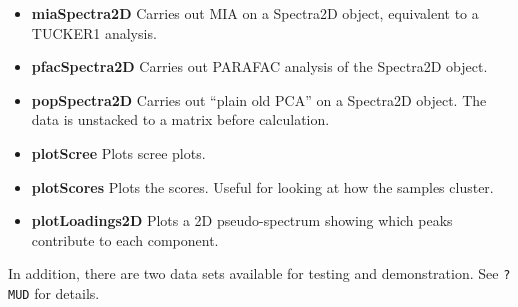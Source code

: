\documentclass[letter,10pt,twocolumn,twoside,printwatermark=false]{pinp}
\providecommand{\tightlist}{%
  \setlength{\itemsep}{0pt}\setlength{\parskip}{0pt}}
\begin{document}
\begin{itemize}
  \begin{itemize}
  \tightlist
  \item
    \textbf{miaSpectra2D} Carries out MIA on a Spectra2D object,
    equivalent to a TUCKER1 analysis.
  \item
    \textbf{pfacSpectra2D} Carries out PARAFAC analysis of the Spectra2D
    object.
  \item
    \textbf{popSpectra2D} Carries out ``plain old PCA'' on a Spectra2D
    object. The data is unstacked to a matrix before calculation.
  \item
    \textbf{plotScree} Plots scree plots.
  \item
    \textbf{plotScores} Plots the scores. Useful for looking at how the
    samples cluster.
  \item
    \textbf{plotLoadings2D} Plots a 2D pseudo-spectrum showing which
    peaks contribute to each component.
  \end{itemize}
\end{itemize}

In addition, there are two data sets available for testing and
demonstration. See \texttt{?MUD} for details.

\renewcommand{\pnasbreak}{\begin{strip}\vskip0pt\end{strip}}

\phantom{xxx}

\showacknow

\pnasbreak 



\end{document}
